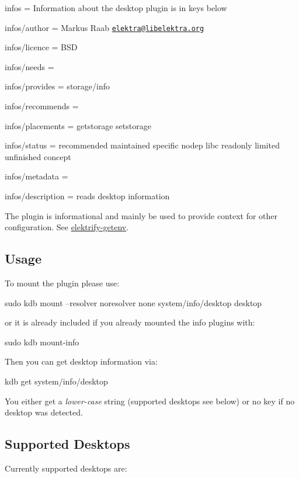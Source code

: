 
\begin{DoxyItemize}
\item infos = Information about the desktop plugin is in keys below
\item infos/author = Markus Raab \href{mailto:elektra@libelektra.org}{\tt elektra@libelektra.\+org}
\item infos/licence = B\+SD
\item infos/needs =
\item infos/provides = storage/info
\item infos/recommends =
\item infos/placements = getstorage setstorage
\item infos/status = recommended maintained specific nodep libc readonly limited unfinished concept
\item infos/metadata =
\item infos/description = reads desktop information
\end{DoxyItemize}

The plugin is informational and mainly be used to provide context for other configuration. See \hyperlink{src_libs_getenv_README_md}{elektrify-\/getenv}.

\subsection*{Usage}

To mount the plugin please use\+: \begin{DoxyVerb}sudo kdb mount --resolver noresolver none system/info/desktop desktop
\end{DoxyVerb}


or it is already included if you already mounted the info plugins with\+: \begin{DoxyVerb}sudo kdb mount-info
\end{DoxyVerb}


Then you can get desktop information via\+: \begin{DoxyVerb}kdb get system/info/desktop
\end{DoxyVerb}


You either get a {\itshape lower-\/case} string (supported desktops see below) or no key if no desktop was detected.

\subsection*{Supported Desktops}

Currently supported desktops are\+:


